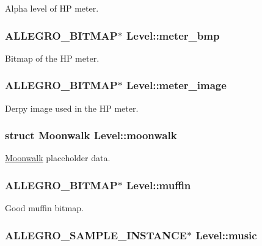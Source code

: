 \-Alpha level of \-H\-P meter. \hypertarget{structLevel_a4e78a54cbf3cdcc804f65acb03cef0b3}{
\subsubsection[{meter\-\_\-bmp}]{\setlength{\rightskip}{0pt plus 5cm}\-A\-L\-L\-E\-G\-R\-O\-\_\-\-B\-I\-T\-M\-A\-P$\ast$ {\bf \-Level\-::meter\-\_\-bmp}}}\label{structLevel_a4e78a54cbf3cdcc804f65acb03cef0b3}
\-Bitmap of the \-H\-P meter. \hypertarget{structLevel_a371c97dfa3d564a19648cb1b72edbf60}{
\subsubsection[{meter\-\_\-image}]{\setlength{\rightskip}{0pt plus 5cm}\-A\-L\-L\-E\-G\-R\-O\-\_\-\-B\-I\-T\-M\-A\-P$\ast$ {\bf \-Level\-::meter\-\_\-image}}}\label{structLevel_a371c97dfa3d564a19648cb1b72edbf60}
\-Derpy image used in the \-H\-P meter. \hypertarget{structLevel_ab9e39b9ac0f342332e034c59d55d6a07}{
\subsubsection[{moonwalk}]{\setlength{\rightskip}{0pt plus 5cm}struct {\bf \-Moonwalk} {\bf \-Level\-::moonwalk}}}\label{structLevel_ab9e39b9ac0f342332e034c59d55d6a07}
\hyperlink{structMoonwalk}{\-Moonwalk} placeholder data. \hypertarget{structLevel_ad4d4190d232b674d4211f3355a9b7a93}{
\subsubsection[{muffin}]{\setlength{\rightskip}{0pt plus 5cm}\-A\-L\-L\-E\-G\-R\-O\-\_\-\-B\-I\-T\-M\-A\-P$\ast$ {\bf \-Level\-::muffin}}}\label{structLevel_ad4d4190d232b674d4211f3355a9b7a93}
\-Good muffin bitmap. \hypertarget{structLevel_a41c6aae8f508e078b02c291e1d6f8e67}{
\subsubsection[{music}]{\setlength{\rightskip}{0pt plus 5cm}\-A\-L\-L\-E\-G\-R\-O\-\_\-\-S\-A\-M\-P\-L\-E\-\_\-\-I\-N\-S\-T\-A\-N\-C\-E$\ast$ {\bf \-Level\-::music}}}\label{structLevel_a41c6aae8f508e078b02c291e1d6f8e67}
